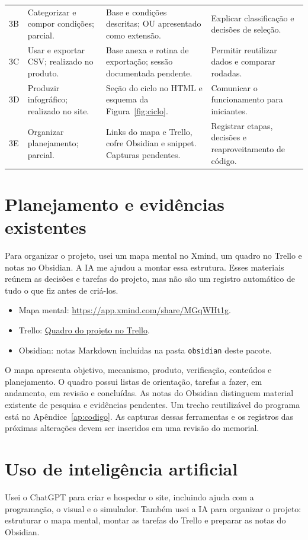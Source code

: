 \documentclass[12pt,a4paper]{article}
\begin{document}
\begin{longtable}{p{}p{}p{}p{}}
3B & Categorizar e compor condições; parcial. & Base e condições descritas; OU apresentado como extensão. & Explicar classificação e decisões de seleção.\\
3C & Usar e exportar CSV; realizado no produto. & Base anexa e rotina de exportação; sessão documentada pendente. & Permitir reutilizar dados e comparar rodadas.\\
3D & Produzir infográfico; realizado no site. & Seção do ciclo no HTML e esquema da Figura~\ref{fig:ciclo}. & Comunicar o funcionamento para iniciantes.\\
3E & Organizar planejamento; parcial. & Links do mapa e Trello, cofre Obsidian e snippet. Capturas pendentes. & Registrar etapas, decisões e reaproveitamento de código.\\
\bottomrule
\end{longtable}\normalsize
\section{Planejamento e evidências existentes}
Para organizar o projeto, usei um mapa mental no Xmind, um quadro no Trello e notas no Obsidian. A IA me ajudou a montar essa estrutura. Esses materiais reúnem as decisões e tarefas do projeto, mas não são um registro automático de tudo o que fiz antes de criá-los.
\begin{itemize}
\item Mapa mental: \url{https://app.xmind.com/share/MGqWHt1g}.
\item Trello: \href{https://trello.com/b/fPSRjyWN/entre-cliques-projeto-final-de-fui}{Quadro do projeto no Trello}.
\item Obsidian: notas Markdown incluídas na pasta \texttt{obsidian} deste pacote.
\end{itemize}
O mapa apresenta objetivo, mecanismo, produto, verificação, conteúdos e planejamento. O quadro possui listas de orientação, tarefas a fazer, em andamento, em revisão e concluídas. As notas do Obsidian distinguem material existente de pesquisa e evidências pendentes. Um trecho reutilizável do programa está no Apêndice~\ref{ap:codigo}. As capturas dessas ferramentas e os registros das próximas alterações devem ser inseridos em uma revisão do memorial.
\section{Uso de inteligência artificial}
Usei o ChatGPT para criar e hospedar o site, incluindo ajuda com a programação, o visual e o simulador. Também usei a IA para organizar o projeto: estruturar o mapa mental, montar as tarefas do Trello e preparar as notas do Obsidian.
\end{document}

